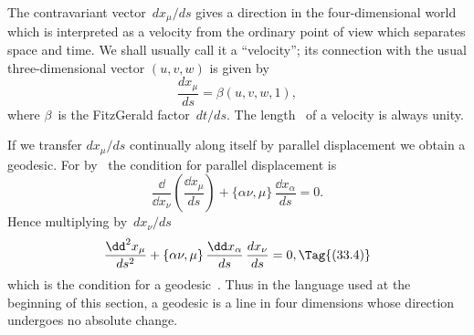 \documentclass[12pt]{book}
\begin{document}
The contravariant vector~$dx_{\mu}/ds$ gives a direction in the four-dimensional
world which is interpreted as a velocity from the ordinary point of view which
separates space and time. We shall usually call it a ``velocity''; its connection
with the usual three-dimensional vector $(u, v, w)$ is given by
\[
\frac{dx_{\mu}}{ds} = \beta(u, v, w, 1),
\]
where $\beta$~is the FitzGerald factor~$dt/ds$. The length~ of a velocity is
always unity.

If we transfer $dx_{\mu}/ds$ continually along itself by parallel displacement we
obtain a geodesic. For by~ the condition for parallel displacement is
\[
\frac{\dd}{\dd x_{\nu}} \left(\frac{\dd x_{\mu}}{ds}\right) + \{\alpha\nu, \mu\}\, \frac{\dd x_{\alpha}}{ds} = 0.
\]
Hence multiplying by~$dx_{\nu}/ds$
\[
\frac{\dd^{2} x_{\mu}}{ds^{2}} + \{\alpha\nu, \mu\}\, \frac{\dd x_{\alpha}}{ds}\, \frac{dx_{\nu}}{ds} = 0,
\Tag{(33.4)}
\]
which is the condition for a geodesic~. Thus in the language used at
the beginning of this section, a geodesic is a line in four dimensions whose
direction undergoes no absolute change.

\end{document}
